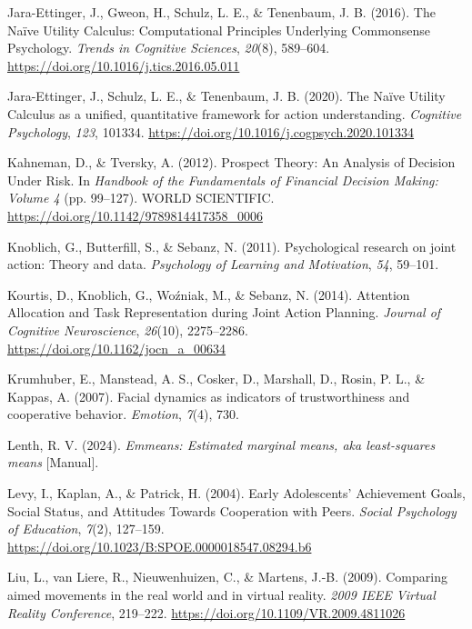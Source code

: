 \documentclass[
  11pt,
  letterpaper,
]{article}
\newlength{\cslhangindent}
\newenvironment{CSLReferences}[2] %
 {\begin{list}{}{%
  \setlength{\itemindent}{0pt}
  \setlength{\leftmargin}{0pt}
  \setlength{\parsep}{0pt}
  \ifodd #1
   \setlength{\leftmargin}{\cslhangindent}
   \setlength{\itemindent}{-1\cslhangindent}
  \fi
  \setlength{\itemsep}{#2\baselineskip}}}
 {\end{list}}
\renewcommand{\emph}[1]{\textit{#1}}  %
\begin{document}
\begin{CSLReferences}{1}{0}
Jara-Ettinger, J., Gweon, H., Schulz, L. E., \& Tenenbaum, J. B. (2016).
The {Naïve Utility Calculus}: {Computational Principles Underlying
Commonsense Psychology}. \emph{Trends in Cognitive Sciences},
\emph{20}(8), 589--604. \url{https://doi.org/10.1016/j.tics.2016.05.011}

Jara-Ettinger, J., Schulz, L. E., \& Tenenbaum, J. B. (2020). The {Naïve
Utility Calculus} as a unified, quantitative framework for action
understanding. \emph{Cognitive Psychology}, \emph{123}, 101334.
\url{https://doi.org/10.1016/j.cogpsych.2020.101334}

Kahneman, D., \& Tversky, A. (2012). Prospect {Theory}: {An Analysis} of
{Decision Under Risk}. In \emph{Handbook of the {Fundamentals} of
{Financial Decision Making}: Volume 4} (pp. 99--127). WORLD SCIENTIFIC.
\url{https://doi.org/10.1142/9789814417358_0006}

Knoblich, G., Butterfill, S., \& Sebanz, N. (2011). Psychological
research on joint action: Theory and data. \emph{Psychology of Learning
and Motivation}, \emph{54}, 59--101.

Kourtis, D., Knoblich, G., Woźniak, M., \& Sebanz, N. (2014). Attention
{Allocation} and {Task Representation} during {Joint Action Planning}.
\emph{Journal of Cognitive Neuroscience}, \emph{26}(10), 2275--2286.
\url{https://doi.org/10.1162/jocn_a_00634}

Krumhuber, E., Manstead, A. S., Cosker, D., Marshall, D., Rosin, P. L.,
\& Kappas, A. (2007). Facial dynamics as indicators of trustworthiness
and cooperative behavior. \emph{Emotion}, \emph{7}(4), 730.

Lenth, R. V. (2024). \emph{Emmeans: {Estimated} marginal means, aka
least-squares means} {[}Manual{]}.

Levy, I., Kaplan, A., \& Patrick, H. (2004). Early {Adolescents}'
{Achievement Goals}, {Social Status}, and {Attitudes Towards
Cooperation} with {Peers}. \emph{Social Psychology of Education},
\emph{7}(2), 127--159.
\url{https://doi.org/10.1023/B:SPOE.0000018547.08294.b6}

{Liu, L., van Liere, R., Nieuwenhuizen, C., \& Martens, J.-B.} (2009).
Comparing aimed movements in the real world and in virtual reality.
\emph{2009 {IEEE} Virtual Reality Conference}, 219--222.
\url{https://doi.org/10.1109/VR.2009.4811026}


\end{CSLReferences}
\end{document}
